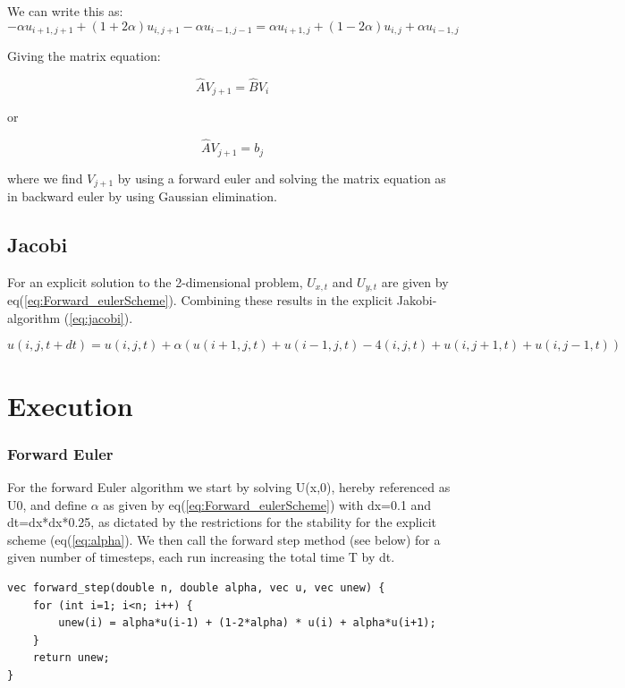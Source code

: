 \documentclass[a4paper,10pt]{article}
\begin{document}
We can write this as:
\begin{equation}
 -\alpha u_{i+1,j+1} + (1+2\alpha)u_{i,j+1} - \alpha u_{i-1,j-1} =  \alpha u_{i+1,j} + (1-2\alpha)u_{i,j} + \alpha u_{i-1,j}
\end{equation}

Giving the matrix equation:

\begin{equation}
 \hat{A}V_{j+1} = \hat{B}V_{i}
\end{equation}

or

\begin{equation}
 \hat{A}V_{j+1} = b_{j}
\end{equation}

where we find $V_{j+1}$ by using a forward euler and solving the matrix equation as in backward euler by using Gaussian elimination. 

\subsection{Jacobi}
For an explicit solution to the 2-dimensional problem, $U_{x,t}$ and $U_{y,t}$ are given by eq(\ref{eq:Forward_eulerScheme}). Combining these results in the explicit Jakobi-algorithm (\ref{eq:jacobi}).

\begin{equation}
  u(i,j,t+dt) = u(i,j,t) + \alpha(u(i+1,j,t) + u(i-1,j,t) - 4(i,j,t) + u(i,j+1,t) +
      
      u(i,j-1,t))
\label{eq:jacobi}
\end{equation}

\section{Execution}

\subsubsection{Forward Euler}
For the forward Euler algorithm we start by solving U(x,0), hereby referenced as U0, and define $\alpha$ as given by eq(\ref{eq:Forward_eulerScheme}) with dx=0.1 and dt=dx*dx*0.25, as dictated by the
restrictions for the stability for the explicit scheme (eq(\ref{eq:alpha}). We then call the forward step method (see below) for a given number of timesteps, each run increasing the total time T by dt.
\begin{verbatim}
vec forward_step(double n, double alpha, vec u, vec unew) {
    for (int i=1; i<n; i++) {
        unew(i) = alpha*u(i-1) + (1-2*alpha) * u(i) + alpha*u(i+1);
    }
    return unew;
} 
\end{verbatim}
\end{document}

